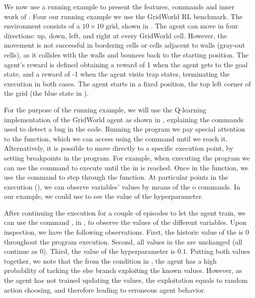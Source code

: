 We now use a running example to present the features, commands and inner work of \flik. Four 
our running example we use the GridWorld \ac{RL} benchmark. The environment consists of a 
$10 \times 10$ grid, shown in . The agent can move in four directions: up, down, 
left, and right at every GridWorld cell. However, the movement is not successful in bordering cells 
or cells adjacent to walls (\ie gray-out cells), as it collides with the walls and bounces back to the 
starting position.
The agent's reward is defined obtaining a reward of 1 when the agent gets to the goal state, and a 
reward of -1 when the agent visits trap states, terminating the execution in both cases. The agent 
starts in a fixed position, the top left corner of the grid (the blue state in ). 

For the purpose of the running example, we will use the Q-learning implementation of the GridWorld 
agent as shown in , explaining the \flik commands used to detect a bug in 
the code. Running the program we pay special attention to the  function, which we can 
access using the  command until we reach it. Alternatively, it is possible to move directly to a 
specific execution point, by setting breakpoints in the program. For example, when executing the 
program we can use the  command to execute until the  in  
is reached. Once in the function, we use the  command to step through the function. 
At particular points in the execution (\eg {}), we can observe variables' values by means 
of the  o  commands. In our example, we could use  to see the 
value of the  hyperparameter. 

After continuing the execution for a couple of episodes to let the agent train, we can use the 
command , in , to observe the values of the different variables. Upon 
inspection, we have the following observations. First, the historic value of the  is $0$ 
throughout the program execution. Second, all values in the  are unchanged (all continue 
as 0). Third, the value of the  hyperparameter is $0.1$. 
Putting both values together, we note that the from the condition in , the agent has a 
high probability of tacking the else branch exploiting the known values. However, as the agent has 
not trained updating the values, the exploitation equals to random action choosing, and therefore 
leading to erroneous agent behavior.

